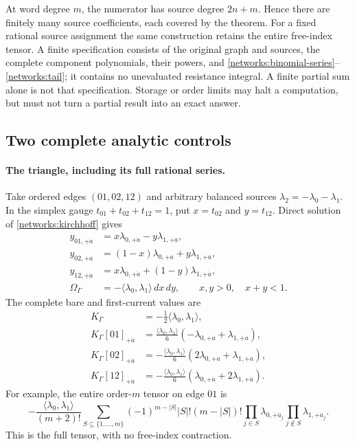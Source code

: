 At word degree $m$, the numerator has source degree $2n+m$.  Hence there
are finitely many source coefficients, each covered by the theorem.
For a fixed rational source assignment the same construction retains the
entire free-index tensor.  A finite specification consists of the original
graph and sources, the complete component polynomials, their powers, and
\eqref{networks:binomial-series}--\eqref{networks:tail}; it contains no
unevaluated resistance integral.  A finite partial sum alone is not that
specification.  Storage or order limits may halt a computation, but must
not turn a partial result into an exact answer.

\subsection{Two complete analytic controls}
\label{networks:controls}

\paragraph{The triangle, including its full rational series.}
Take ordered edges $(01,02,12)$ and arbitrary balanced sources
$\lambda_2=-\lambda_0-\lambda_1$.  In the simplex gauge
$t_{01}+t_{02}+t_{12}=1$, put $x=t_{02}$ and $y=t_{12}$.  Direct solution
of \eqref{networks:kirchhoff} gives
\begin{align}
 y_{01,+\dot a}&=x\lambda_{0,+\dot a}-y\lambda_{1,+\dot a},\\
 y_{02,+\dot a}&=(1-x)\lambda_{0,+\dot a}+y\lambda_{1,+\dot a},\\
 y_{12,+\dot a}&=x\lambda_{0,+\dot a}+(1-y)\lambda_{1,+\dot a},\\
 \Omega_\Gamma&=-\langle\lambda_0,\lambda_1\rangle\,dx\,dy,
 \qquad x,y>0,\quad x+y<1.
 \label{networks:triangle-chart}
\end{align}
The complete bare and first-current values are
\begin{align}
 K_\Gamma&=-\frac12\langle\lambda_0,\lambda_1\rangle,\\
 K_\Gamma[01]_{+\dot a}
 &=\frac{\langle\lambda_0,\lambda_1\rangle}{6}
                       (-\lambda_{0,+\dot a}+\lambda_{1,+\dot a}),\\
 K_\Gamma[02]_{+\dot a}
 &=-\frac{\langle\lambda_0,\lambda_1\rangle}{6}
                       (2\lambda_{0,+\dot a}+\lambda_{1,+\dot a}),\\
 K_\Gamma[12]_{+\dot a}
 &=-\frac{\langle\lambda_0,\lambda_1\rangle}{6}
                       (\lambda_{0,+\dot a}+2\lambda_{1,+\dot a}).
 \label{networks:triangle-values}
\end{align}
For example, the entire order-$m$ tensor on edge $01$ is
\begin{equation}
 -\frac{\langle\lambda_0,\lambda_1\rangle}{(m+2)!}
 \sum_{S\subseteq\{1,\ldots,m\}}(-1)^{m-|S|}|S|!(m-|S|)!
 \prod_{j\in S}\lambda_{0,+\dot a_j}
 \prod_{j\notin S}\lambda_{1,+\dot a_j}.
 \label{networks:triangle-all-orders}
\end{equation}
This is the full tensor, with no free-index contraction.


